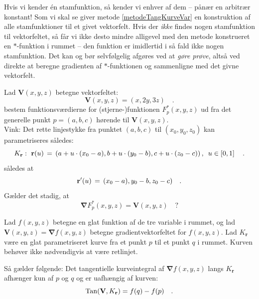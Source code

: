 \begin{think}
Hvis vi kender \'{e}n stamfunktion, så kender vi enhver af dem -- pånær en arbitrær konstant! Som vi skal se giver metode \ref{metodeTangKurveVar} en konstruktion af alle stamfunktioner til et givet vektorfelt. Hvis der \emph{ikke} findes nogen stamfunktion til vektorfeltet, så får vi ikke desto mindre alligevel med den metode konstrueret en $*$-funktion i rummet -- den funktion er imidlertid i så fald ikke nogen stamfunktion. Det kan og bør selvfølgelig afgøres ved at \emph{gøre prøve}, altså ved direkte at beregne gradienten af $*$-funktionen og sammenligne med det givne vektorfelt.
\end{think}


\begin{exercise}\label{exercStjerneOff}
Lad $\mathbf{V}(x,y,z)$ betegne vektorfeltet:
\begin{equation}
\mathbf{V}(x,y,z) = (x, 2y, 3z) \quad .
\end{equation}
bestem funktionsværdierne for (stjerne-)funktionen $F^{*}_{p}(x,y,z)$ ud fra det generelle punkt $p =(a,b,c)$ hørende til $\mathbf{V}(x,y,z)$.\\

Vink: Det rette linjestykke fra punktet $(a,b,c)$ til $(x_{0}, y_{0}, z_{0})$ kan parametriseres således:
\begin{equation}
K_{\bf r}: \,\, {\bf r}(u) \, = \,(a+ u\cdot (x_{0}-a), b+ u\cdot (y_{0}-b),  c+u\cdot ( z_{0}-c)) \, , \, \, \, u \in
\left[ 0, 1\right]\quad .
\end{equation}
således at
\begin{equation}
{\bf r}'(u) \, = \, (x_{0}-a), y_{0}-b,  z_{0}-c) \quad .
\end{equation}
Gælder det stadig, at
\begin{equation}
\bm{\nabla}F^{*}_{p}(x,y,z) = \mathbf{V}(x,y,z) \quad \textrm{?}
\end{equation}
\end{exercise}




\begin{theorem} \label{thmGradTangInt}
Lad $f(x,y,z)$ betegne en glat funktion af de tre variable i rummet, og lad $\mathbf{V}(x,y,z) = \bm{\nabla}f(x,y,z)$ betegne gradientvektorfeltet for $f(x,y,z)$. Lad $K_{\mathbf{r}}$ være en glat parametriseret kurve fra et punkt $p$ til et punkt $q$ i rummet. Kurven behøver ikke nødvendigvis at være retlinjet. 

Så gælder følgende: Det tangentielle kurveintegral af  $\bm{\nabla}f(x,y,z)$ langs $K_{\mathbf{r}}$
afhænger kun af $p$ og $q$ og er uafhængig af kurven:
\begin{equation}
\operatorname{Tan}(\mathbf{V}, K_{\mathbf{r}}) = f(q) - f(p) \quad .
\end{equation}
\end{theorem}


